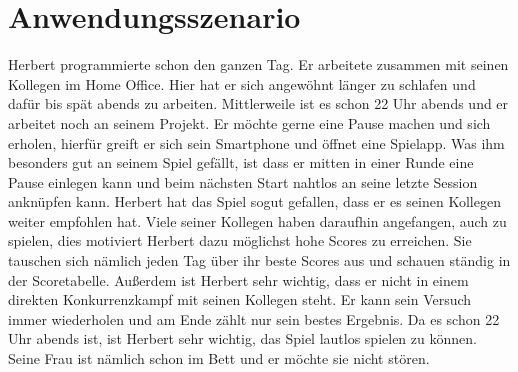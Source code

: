 \documentclass[12pt, a4paper]{article}
\begin{document}
\section{Anwendungsszenario}
\begin{flushleft}
Herbert programmierte schon den ganzen Tag. Er arbeitete zusammen mit seinen Kollegen im Home Office. Hier hat er sich angewöhnt länger zu schlafen und dafür bis spät abends zu arbeiten.
\newline\newline
Mittlerweile ist es schon 22 Uhr abends und er arbeitet noch an seinem Projekt. Er möchte gerne eine Pause machen und sich erholen, hierfür greift er sich sein Smartphone und öffnet eine Spielapp. Was ihm besonders gut an seinem Spiel gefällt, ist dass er mitten in einer Runde eine Pause einlegen kann und beim nächsten Start nahtlos an seine letzte Session anknüpfen kann.  
\newline\newline
Herbert hat das Spiel sogut gefallen, dass er es seinen Kollegen weiter empfohlen hat. Viele seiner Kollegen haben daraufhin angefangen, auch zu spielen, dies motiviert Herbert dazu möglichst hohe Scores zu erreichen. Sie tauschen sich nämlich jeden Tag über ihr beste Scores aus und schauen ständig in der Scoretabelle. 
\newline\newline
Außerdem ist Herbert sehr wichtig, dass er nicht in einem direkten Konkurrenzkampf mit seinen Kollegen steht. Er kann sein Versuch immer wiederholen und am Ende zählt nur sein bestes Ergebnis.
\newline\newline
Da es schon 22 Uhr abends ist, ist Herbert sehr wichtig, das Spiel lautlos spielen zu können. Seine Frau ist nämlich schon im Bett und er möchte sie nicht stören. 
\end{flushleft}

\newpage
\end{document}
